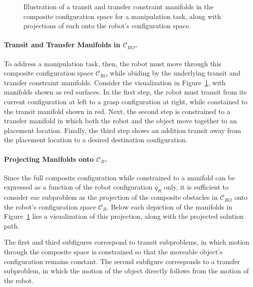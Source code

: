 \begin{figure}
   \centering
   \caption{Illustration of a transit and transfer constraint manifolds
      in the composite configuration space for a manipulation task,
      along with projections of each
      onto the robot's configuration space.}
   \label{fig:family:composite-manifolds}
\end{figure}

\paragraph{Transit and Transfer Manifolds in $\mathcal{C}_{RO}$.}
To address a manipulation task, then,
the robot must move through this composite configuration space
$\mathcal{C}_{RO}$
while abiding by the underlying transit and transfer constraint
manifolds.
Consider the visualization
in Figure~\ref{fig:family:composite-manifolds},
with manifolds shown as red surfaces.
In the first step,
the robot must transit from its current configuration at left
to a grasp configuration at right,
while constained to the transit manifold shown in red.
Next,
the second step is constrained to a transfer manifold
in which both the robot and the object move together
to an placement location.
Finally, the third step shows an addition transit away from
the placement location to a desired destination configuration.

\paragraph{Projecting Manifolds onto $\mathcal{C}_{R}$.}
Since the full composite configuration while constrained to a manifold
can be expressed as a function of the robot configuration $q_R$ only,
it is sufficient to consider eac subproblem as the projection of
the composite obstacles in $\mathcal{C}_{RO}$
onto the robot's configuration space $\mathcal{C}_{R}$.
Below each depiction of the manifolds
in Figure~\ref{fig:family:composite-manifolds}
lies a visualization of this projection,
along with the projected solution path.

The first and third subfigures correspond to transit subproblems,
in which motion through the composite space is constrained so that
the moveable object's configuration remains constant.
The second subfigure corresponds to a transfer subproblem,
in which the motion of the object directly follows from the
motion of the robot.

